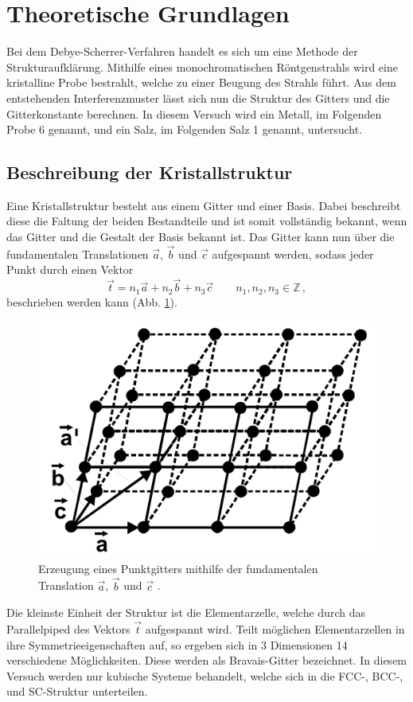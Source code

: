 \section{Theoretische Grundlagen}
\label{sec:theoretische_grundlagen}

Bei dem Debye-Scherrer-Verfahren handelt es sich um eine Methode der Strukturaufklärung.
Mithilfe eines monochromatischen Röntgenstrahls wird eine kristalline Probe bestrahlt, welche zu einer Beugung des Strahls führt.
Aus dem entstehenden Interferenzmuster lässt sich nun die Struktur des Gitters und die Gitterkonstante berechnen.
In diesem Versuch wird ein Metall, im Folgenden Probe 6 genannt, und ein Salz, im Folgenden Salz 1 genannt, untersucht.

\subsection{Beschreibung der Kristallstruktur} %
\label{sub:subsection_name}

Eine Kristallstruktur besteht aus einem Gitter und einer Basis.
Dabei beschreibt diese die Faltung der beiden Bestandteile und ist somit vollständig bekannt, wenn das Gitter und die Gestalt der Basis bekannt ist.
Das Gitter kann nun über die fundamentalen Translationen $\vec{a}$, $\vec{b}$ und $\vec{c}$ aufgespannt werden, sodass jeder Punkt durch einen Vektor
\begin{equation*}
    \vec{t} = n_1 \vec{a} + n_2 \vec{b} + n_3 \vec{c} \qquad n_1, n_2, n_3 \in \mathbb{Z}\,,
\end{equation*}
beschrieben werden kann (Abb. \ref{fig:fund_trans}).

\begin{figure}[h!]
    \centering
    \includegraphics[width=0.5\linewidth]{images/fund_trans.png}
    \caption{Erzeugung eines Punktgitters mithilfe der fundamentalen Translation $\vec{a}$, $\vec{b}$ und $\vec{c}$ \cite{V41}.}
    \label{fig:fund_trans}
\end{figure}

Die kleinste Einheit der Struktur ist die Elementarzelle, welche durch das Parallelpiped des Vektors $\vec{t}$ aufgespannt wird.
Teilt möglichen Elementarzellen in ihre Symmetrieeigenschaften auf, so ergeben sich in 3 Dimensionen 14 verschiedene Möglichkeiten.
Diese werden als Bravais-Gitter bezeichnet.
In diesem Versuch werden nur kubische Systeme behandelt, welche sich in die FCC-, BCC-, und SC-Struktur unterteilen.

